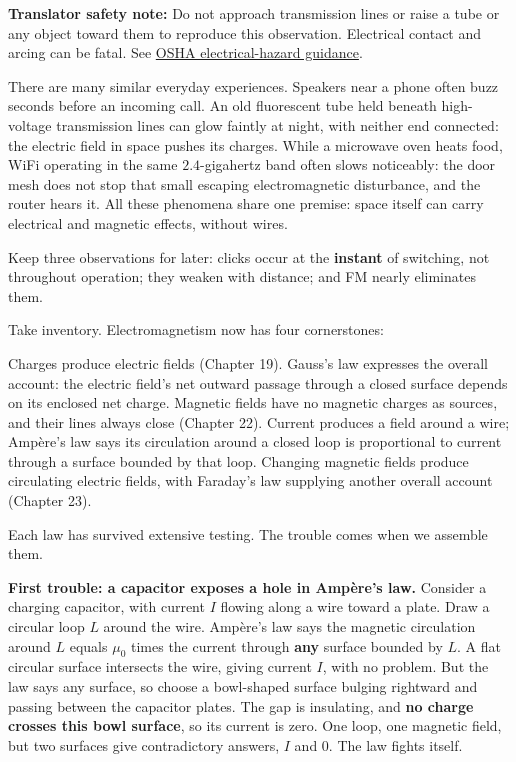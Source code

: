 \textbf{Translator safety note:} Do not approach transmission lines or raise a tube or any object toward them to reproduce this observation. Electrical contact and arcing can be fatal. See \href{https://www.osha.gov/etools/poultry-processing/plant-wide-hazards/electrical-hazards}{OSHA electrical-hazard guidance}.

There are many similar everyday experiences. Speakers near a phone often buzz seconds before an incoming call. An old fluorescent tube held beneath high-voltage transmission lines can glow faintly at night, with neither end connected: the electric field in space pushes its charges. While a microwave oven heats food, WiFi operating in the same \(2.4\)-gigahertz band often slows noticeably: the door mesh does not stop that small escaping electromagnetic disturbance, and the router hears it. All these phenomena share one premise: space itself can carry electrical and magnetic effects, without wires.

Keep three observations for later: clicks occur at the \textbf{instant} of switching, not throughout operation; they weaken with distance; and FM nearly eliminates them.


Take inventory. Electromagnetism now has four cornerstones:

Charges produce electric fields (Chapter 19). Gauss's law expresses the overall account: the electric field's net outward passage through a closed surface depends on its enclosed net charge. Magnetic fields have no magnetic charges as sources, and their lines always close (Chapter 22). Current produces a field around a wire; Ampère's law says its circulation around a closed loop is proportional to current through a surface bounded by that loop. Changing magnetic fields produce circulating electric fields, with Faraday's law supplying another overall account (Chapter 23).

Each law has survived extensive testing. The trouble comes when we assemble them.

\textbf{First trouble: a capacitor exposes a hole in Ampère's law.} Consider a charging capacitor, with current \(I\) flowing along a wire toward a plate. Draw a circular loop \(L\) around the wire. Ampère's law says the magnetic circulation around \(L\) equals \(\mu_0\) times the current through \textbf{any} surface bounded by \(L\). A flat circular surface intersects the wire, giving current \(I\), with no problem. But the law says any surface, so choose a bowl-shaped surface bulging rightward and passing between the capacitor plates. The gap is insulating, and \textbf{no charge crosses this bowl surface}, so its current is zero. One loop, one magnetic field, but two surfaces give contradictory answers, \(I\) and \(0\). The law fights itself.

